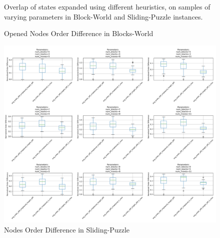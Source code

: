 \documentclass[letterpaper]{article}
\begin{document}
\begin{figure}[ht]
\begin{minipage}{0.39\textwidth}
    \end{minipage}
    \caption{Overlap of states expanded using different heuristics, on samples of varying parameters in Block-World and Sliding-Puzzle instances.}
    \label{fig:heuristic-overlap}
\end{figure}

\begin{figure}[ht]
    \centering
    \begin{minipage}{0.57\textwidth} %
        \centering
        \caption*{Opened Nodes Order Difference in Blocks-World}
        \includegraphics[width=\textwidth]{plots/blocks_world_order_differences.png}
    \end{minipage}%
    \hfill
    \begin{minipage}{0.39\textwidth} %
        \centering
        \caption*{Nodes Order Difference in Sliding-Puzzle}

\end{minipage}
\end{figure}
\end{document}

